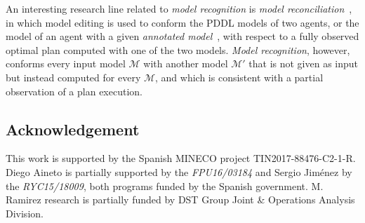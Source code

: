 \documentclass[letterpaper]{article} %
\newcommand{\strips}{\textsc{Strips}}     %
\begin{document}
An interesting research line related to {\em model recognition} is {\em model reconciliation}~\cite{ChakrabortiSZK17}, in which model editing is used to conform the PDDL models of two agents, or the model of an agent with a given {\em annotated model}~\cite{sreedharan2018handling}, with respect to a fully observed optimal plan computed with one of the two models. {\em Model recognition}, however, conforms every input model $\mathcal{M}$ with another model $\mathcal{M}'$ that is not given as input but instead computed for every $\mathcal{M}$, and which is consistent with a partial observation of a plan execution.

















\subsection*{Acknowledgement}
This work is supported by the Spanish MINECO project TIN2017-88476-C2-1-R. Diego Aineto is partially supported by the {\it FPU16/03184} and Sergio Jim\'enez by the {\it RYC15/18009}, both programs funded by the Spanish government. M. Ramirez research is partially funded by DST Group Joint \& Operations Analysis Division.



\end{document}
